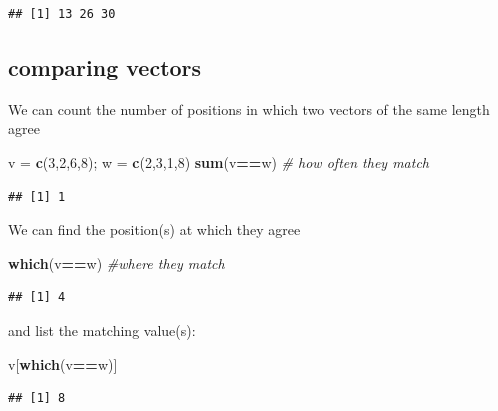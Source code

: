 \documentclass[
]{book}
\newenvironment{Shaded}{\begin{snugshade}}{\end{snugshade}}
\newcommand{\CommentTok}[1]{\textcolor[rgb]{0.56,0.35,0.01}{\textit{#1}}}
\newcommand{\DecValTok}[1]{\textcolor[rgb]{0.00,0.00,0.81}{#1}}
\newcommand{\FunctionTok}[1]{\textcolor[rgb]{0.13,0.29,0.53}{\textbf{#1}}}
\newcommand{\NormalTok}[1]{#1}
\newcommand{\OtherTok}[1]{\textcolor[rgb]{0.56,0.35,0.01}{#1}}
\newcommand{\SpecialCharTok}[1]{\textcolor[rgb]{0.81,0.36,0.00}{\textbf{#1}}}
\theoremstyle{definition}
\theoremstyle{definition}
\theoremstyle{definition}
\theoremstyle{definition}
\theoremstyle{remark}
\begin{document}
\begin{verbatim}
## [1] 13 26 30
\end{verbatim}

\subsection{comparing vectors}\label{comparing-vectors}

We can count the number of positions in which two vectors of the same length agree

\begin{Shaded}
\begin{Highlighting}[]
\NormalTok{v }\OtherTok{=} \FunctionTok{c}\NormalTok{(}\DecValTok{3}\NormalTok{,}\DecValTok{2}\NormalTok{,}\DecValTok{6}\NormalTok{,}\DecValTok{8}\NormalTok{); w }\OtherTok{=} \FunctionTok{c}\NormalTok{(}\DecValTok{2}\NormalTok{,}\DecValTok{3}\NormalTok{,}\DecValTok{1}\NormalTok{,}\DecValTok{8}\NormalTok{)}
\FunctionTok{sum}\NormalTok{(v}\SpecialCharTok{==}\NormalTok{w) }\CommentTok{\# how often they match}
\end{Highlighting}
\end{Shaded}

\begin{verbatim}
## [1] 1
\end{verbatim}

We can find the position(s) at which they agree

\begin{Shaded}
\begin{Highlighting}[]
\FunctionTok{which}\NormalTok{(v}\SpecialCharTok{==}\NormalTok{w) }\CommentTok{\#where they match}
\end{Highlighting}
\end{Shaded}

\begin{verbatim}
## [1] 4
\end{verbatim}

and list the matching value(s):

\begin{Shaded}
\begin{Highlighting}[]
\NormalTok{v[}\FunctionTok{which}\NormalTok{(v}\SpecialCharTok{==}\NormalTok{w)] }
\end{Highlighting}
\end{Shaded}

\begin{verbatim}
## [1] 8
\end{verbatim}
\end{document}
